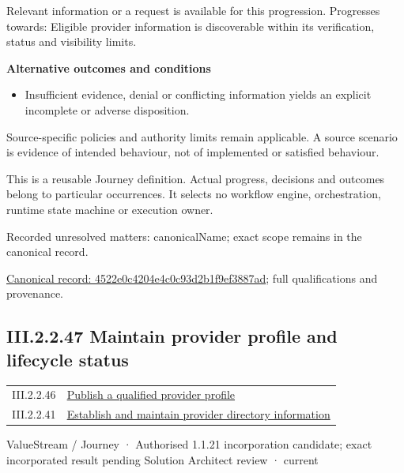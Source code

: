 Relevant information or a request is available for this progression. Progresses towards: Eligible provider information is discoverable within its verification, status and visibility limits.



\par\medskip\textbf{Alternative outcomes and conditions}\par


\begin{itemize}


\item Insufficient evidence, denial or conflicting information yields an explicit incomplete or adverse disposition.

\end{itemize}


Source-specific policies and authority limits remain applicable. A source scenario is evidence of intended behaviour, not of implemented or satisfied behaviour.



This is a reusable Journey definition. Actual progress, decisions and outcomes belong to particular occurrences. It selects no workflow engine, orchestration, runtime state machine or execution owner.


{\small Recorded unresolved matters: canonicalName; exact scope remains in the canonical record.}\par
{\footnotesize \href{../../../../../../../continuum/strategy/value-stream/4522e0c4204e4c0c93d2b1f9ef3887ad.md}{Canonical record: 4522e0c4204e4c0c93d2b1f9ef3887ad}; full qualifications and provenance.}\par
\subsection*{III.2.2.47 Maintain provider profile and lifecycle status}
\label{navigation:III.2.2.47}

\begin{longtable}{p{.22\linewidth}p{.73\linewidth}}
III.2.2.46 & \hyperref[element:4522e0c4204e4c0c93d2b1f9ef3887ad]{Publish a qualified provider profile} \\
III.2.2.41 & \hyperref[element:679b0055ee5d42d4a838e35edd3de01f]{Establish and maintain provider directory information} \\
\end{longtable}
\label{element:79cb51c0f6184273af18b5e0bac64720}
{\small ValueStream / Journey · Authorised 1.1.21 incorporation candidate; exact incorporated result pending Solution Architect review · current}\par

